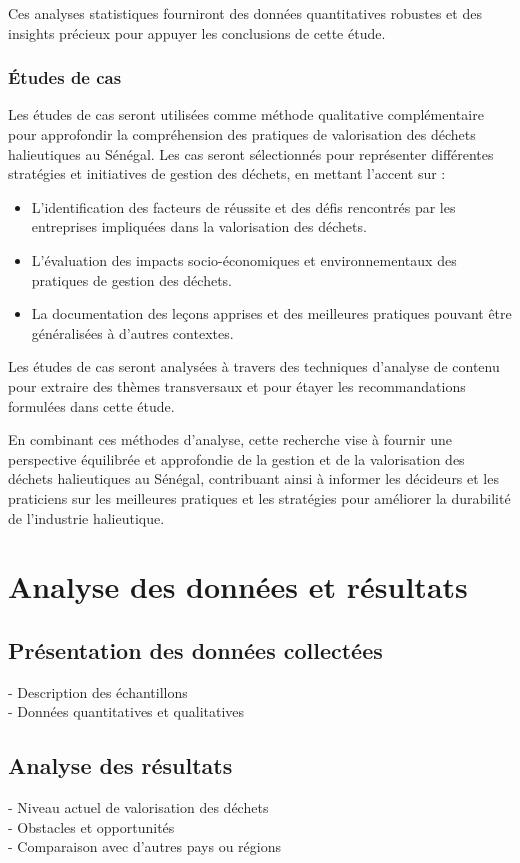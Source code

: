 \documentclass[12pt,a4paper]{report}
\begin{document}
Ces analyses statistiques fourniront des données quantitatives robustes et des insights précieux pour appuyer les conclusions de cette étude.

\subsection{Études de cas}

Les études de cas seront utilisées comme méthode qualitative complémentaire pour approfondir la compréhension des pratiques de valorisation des déchets halieutiques au Sénégal. Les cas seront sélectionnés pour représenter différentes stratégies et initiatives de gestion des déchets, en mettant l'accent sur :

\begin{itemize}
    \item L'identification des facteurs de réussite et des défis rencontrés par les entreprises impliquées dans la valorisation des déchets.
    \item L'évaluation des impacts socio-économiques et environnementaux des pratiques de gestion des déchets.
    \item La documentation des leçons apprises et des meilleures pratiques pouvant être généralisées à d'autres contextes.
\end{itemize}

Les études de cas seront analysées à travers des techniques d'analyse de contenu pour extraire des thèmes transversaux et pour étayer les recommandations formulées dans cette étude.

En combinant ces méthodes d'analyse, cette recherche vise à fournir une perspective équilibrée et approfondie de la gestion et de la valorisation des déchets halieutiques au Sénégal, contribuant ainsi à informer les décideurs et les praticiens sur les meilleures pratiques et les stratégies pour améliorer la durabilité de l'industrie halieutique.


\chapter{Analyse des données et résultats}
\section{Présentation des données collectées}
- Description des échantillons\\
- Données quantitatives et qualitatives

\section{Analyse des résultats}
- Niveau actuel de valorisation des déchets\\
- Obstacles et opportunités\\
- Comparaison avec d'autres pays ou régions
\end{document}
